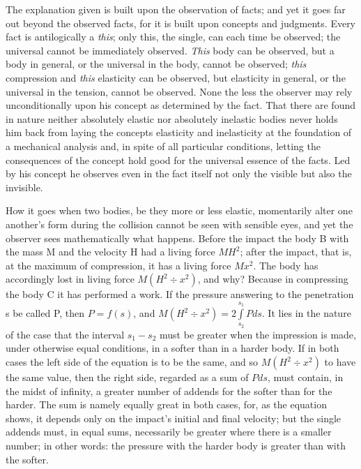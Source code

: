 \documentclass[12pt,a4paper]{book}
\begin{document}
The explanation given is built upon the observation of facts; and yet it goes far out beyond the
observed facts, for it is built upon concepts and judgments. Every fact is antilogically a
\emph{this}; only
this, the single, can each time be observed; the universal cannot be immediately observed.
\emph{This} body can be observed, but a body in general, or the universal in the body, cannot be
observed; \emph{this} compression and \emph{this} elasticity can be observed, but elasticity in
general, or the universal in the tension, cannot be observed. None the less the observer may
rely unconditionally upon his concept as determined by the fact. That there are found in nature
neither absolutely elastic nor absolutely inelastic bodies never holds him back from laying the
concepts elasticity and inelasticity at the foundation of a mechanical analysis and, in spite of
all particular conditions, letting the consequences of the concept hold good for the universal
essence of the facts. Led by his concept he observes even in the fact itself not only the
visible but also the invisible.

How it goes when two bodies, be they more or less elastic, momentarily alter one another's form
during the collision cannot be seen with sensible eyes, and yet the observer sees mathematically
what happens. Before the impact the body B with the mass M and the velocity H had a living force
$MH^2$; after the impact, that is, at the maximum of compression, it has a living force $Mx^2$.
The body has accordingly lost in living force $M (H^2 \div x^2)$, and why? Because in compressing
the body C it has performed a work. If the pressure answering to the penetration s be called P,
then $P = f(s)$, and $M (H^2 \div x^2) = 2 \int\limits_{s_2}^{s_1} Pds$. It lies in the nature
of the case that the interval $s_1 - s_2$ must be greater when the impression is made, under
otherwise equal conditions, in a softer than in a harder body. If in both cases the left side of
the equation is to be the same, and so $M (H^2 \div x^2)$ to have the same value, then the right
side, regarded as a sum of $Pds$, must contain, in the midst of infinity, a greater
{\small number of addends for the softer than for the harder. The sum is namely equally great in
both cases, for, as the equation shows, it depends only on the impact's initial and final
velocity; but the single addends must, in equal sums, necessarily be greater where there is a
smaller number; in other words: the pressure with the harder body is greater than with the
softer.}
\end{document}
